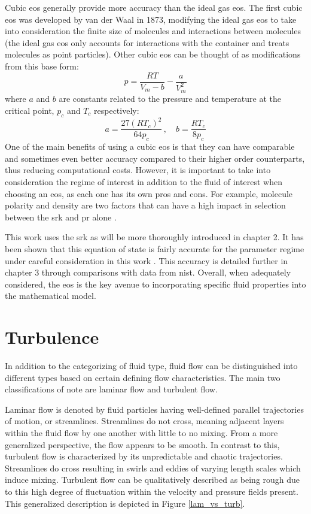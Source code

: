 Cubic \gls{eos} generally provide more accuracy than the ideal gas \gls{eos}. The first cubic \gls{eos} was developed by van der Waal in 1873, modifying the ideal gas \gls{eos} to take into consideration the finite size of molecules and interactions between molecules (the ideal gas \gls{eos} only accounts for interactions with the container and treats molecules as point particles). Other cubic \gls{eos} can be thought of as modifications from this base form: 
\begin{equation} \label{vanderwaal}
p = \dfrac{RT}{V_m - b} - \dfrac{a}{V_m^2}
\end{equation}
where $a$ and $b$ are constants related to the pressure and temperature at the critical point, $p_c$ and $T_c$ respectively: 
$$a = \dfrac{27(RT_c)^2}{64p_c}\,, \quad b = \dfrac{RT_c}{8p_c}$$
One of the main benefits of using a cubic \gls{eos} is that they can have comparable and sometimes even better accuracy compared to their higher order counterparts, thus reducing computational costs. However, it is important to take into consideration the regime of interest in addition to the fluid of interest when choosing an \gls{eos}, as each one has its own pros and cons. For example, molecule polarity and density are two factors that can have a high impact in selection between the \gls{srk} and \gls{pr} alone \cite{GHANBARI201713}. 

This work uses the \gls{srk} as will be more thoroughly introduced in chapter 2. It has been shown that this equation of state is fairly accurate for the parameter regime under careful consideration in this work \cite{}. This accuracy is detailed further in chapter 3 through comparisons with data from \gls{nist}. Overall, when adequately considered, the \gls{eos} is the key avenue to incorporating specific fluid properties into the mathematical model.


\section{Turbulence}
In addition to the categorizing of fluid type, fluid flow can be distinguished into different types based on certain defining flow characteristics. The main two classifications of note are laminar flow and turbulent flow.

Laminar flow is denoted by fluid particles having well-defined parallel trajectories of motion, or streamlines. Streamlines do not cross, meaning adjacent layers within the fluid flow by one another with little to no mixing. From a more generalized perspective, the flow appears to be smooth. In contrast to this, turbulent flow is characterized by its unpredictable and chaotic trajectories. Streamlines do cross resulting in swirls and eddies of varying length scales which induce mixing. Turbulent flow can be qualitatively described as being rough due to this high degree of fluctuation within the velocity and pressure fields present. This generalized description is depicted in Figure \ref{lam_vs_turb}.

